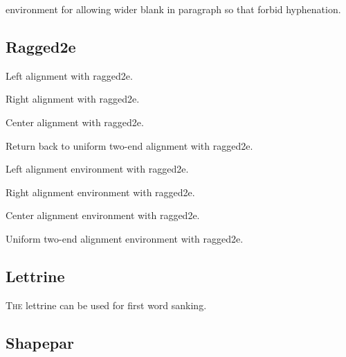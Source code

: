 \begin{sloppypar}
    environment for allowing wider blank in paragraph so that forbid hyphenation.
\end{sloppypar}

\subsection{Ragged2e}   %
{\RaggedRight
Left alignment with ragged2e. \par
\RaggedLeft
Right alignment with ragged2e. \par
\Centering
Center alignment with ragged2e. \par
\justifying
Return back to uniform two-end alignment with ragged2e.}

\begin{FlushLeft}
    Left alignment environment with ragged2e.
\end{FlushLeft}

\begin{FlushRight}
    Right alignment environment with ragged2e.
\end{FlushRight}

\begin{Center}
    Center alignment environment with ragged2e.
\end{Center}

\begin{justify}
    Uniform two-end alignment environment with ragged2e.
\end{justify}

\subsection{Lettrine}
\lettrine{T}{he} lettrine can be used for first word sanking.

\subsection{Shapepar}
